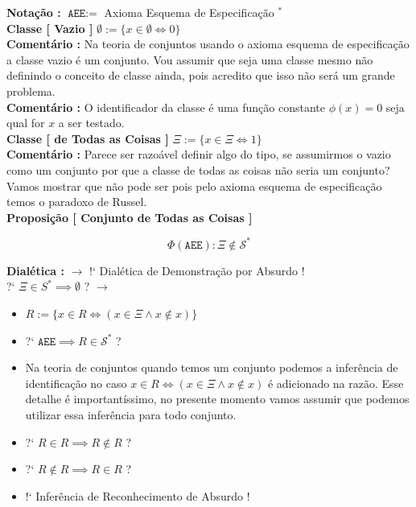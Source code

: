 \documentclass[10pt,a4paper]{report}
\begin{document}
\textbf{Notação :} $\texttt{AEE} :=$ Axioma Esquema de Especificação $^*$\\

\textbf{Classe [ Vazio ]} $ \emptyset := \{  x \in \emptyset \iff 0 \} $ \\

\textbf{Comentário :} Na teoria de conjuntos usando o axioma esquema de especificação a classe vazio é um conjunto. Vou assumir que seja uma classe mesmo não definindo o conceito de classe ainda, pois acredito que isso não será um grande problema.\\

\textbf{Comentário :} O identificador da classe é uma função constante $ \phi(x) = 0 $ seja qual for $x$ a ser testado.\\

\textbf{Classe [ de Todas as Coisas ]} $ \Xi := \{ x \in \Xi \iff 1 \} $\\

\textbf{Comentário :} Parece ser razoável definir algo do tipo, se assumirmos o vazio como um conjunto por que a classe de todas as coisas não seria um conjunto? Vamos mostrar que não pode ser pois pelo axioma esquema de especificação temos o paradoxo de Russel.\\

\textbf{Proposição [ Conjunto de Todas as Coisas ]}

$$ \Phi( \texttt{AEE} ) : \Xi \notin \mathcal{S}^* $$

\textbf{Dialética :} $\rightarrow$ !` Dialética de Demonstração por Absurdo !\\

?` $ \Xi \in S^* \implies \emptyset $  ? $\rightarrow$

\begin{itemize}
	\item[ ] $ R := \{ x \in R \iff ( x \in \Xi \wedge x \notin x ) \} $
	\item[ ] ?` $ \texttt{AEE} \implies R \in \mathcal{S}^* $ ?
	\item[ (i) ] Na teoria de conjuntos quando temos um conjunto podemos a inferência de identificação no caso $ x \in R \iff ( x \in \Xi \wedge x \notin x ) $ é adicionado na razão. Esse detalhe é importantíssimo, no presente momento vamos assumir que podemos utilizar essa inferência para todo conjunto.
	\item[ ] ?` $ R \in R \implies R \notin R $ ?
	\item[ ] ?` $ R \notin R \implies R \in R $ ?
	\item[ ] !` Inferência de Reconhecimento de Absurdo !
\end{itemize}
\end{document}
